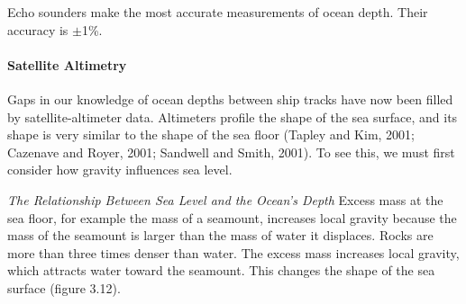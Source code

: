 Echo sounders make the most accurate measurements
of ocean depth. Their accuracy is $\pm$1\%.

\paragraph{Satellite Altimetry} Gaps in our knowledge of ocean depths between ship tracks have now been filled
by satellite-altimeter data. Altimeters profile the shape of the sea surface, and
its shape is very similar to the shape of the sea floor (Tapley and Kim, 2001;
Cazenave and Royer, 2001; Sandwell and Smith, 2001). To see this,
we must first consider how gravity influences sea level.

\textit{The Relationship Between Sea Level and the Ocean's Depth}
Excess mass at the sea floor, for example the mass of a seamount, increases local
gravity because the mass of the seamount is larger than the mass of water it
displaces. Rocks are more than three times denser than water. The excess mass
increases local gravity, which attracts water toward the seamount. This changes
the shape of the sea surface (figure 3.12).

